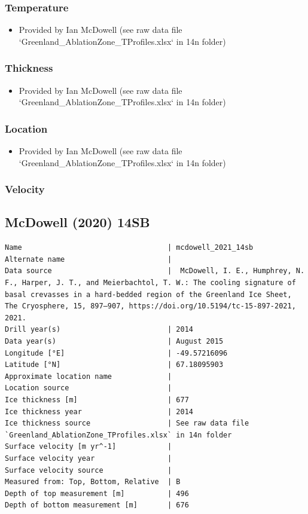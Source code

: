 \documentclass[article,a4paper,times,11pt,twoside]{article}
\begin{document}
\subsubsection{Temperature}
\label{sec:org6b4b784}

\begin{itemize}
\item Provided by Ian McDowell (see raw data file `Greenland\_AblationZone\_TProfiles.xlsx` in 14n folder)
\end{itemize}

\subsubsection{Thickness}
\label{sec:org78777b8}

\begin{itemize}
\item Provided by Ian McDowell (see raw data file `Greenland\_AblationZone\_TProfiles.xlsx` in 14n folder)
\end{itemize}

\subsubsection{Location}
\label{sec:org8b51f47}

\begin{itemize}
\item Provided by Ian McDowell (see raw data file `Greenland\_AblationZone\_TProfiles.xlsx` in 14n folder)
\end{itemize}

\subsubsection{Velocity}
\label{sec:org63b3212}
\clearpage
\subsection{McDowell (2020) 14SB}
\label{sec:org909041d}
\begin{verbatim}
Name                                  | mcdowell_2021_14sb
Alternate name                        | 
Data source                           |  McDowell, I. E., Humphrey, N. F., Harper, J. T., and Meierbachtol, T. W.: The cooling signature of basal crevasses in a hard-bedded region of the Greenland Ice Sheet, The Cryosphere, 15, 897–907, https://doi.org/10.5194/tc-15-897-2021, 2021.
Drill year(s)                         | 2014
Data year(s)                          | August 2015
Longitude [°E]                        | -49.57216096
Latitude [°N]                         | 67.18095903
Approximate location name             | 
Location source                       | 
Ice thickness [m]                     | 677
Ice thickness year                    | 2014
Ice thickness source                  | See raw data file `Greenland_AblationZone_TProfiles.xlsx` in 14n folder
Surface velocity [m yr^-1]            | 
Surface velocity year                 | 
Surface velocity source               | 
Measured from: Top, Bottom, Relative  | B
Depth of top measurement [m]          | 496
Depth of bottom measurement [m]       | 676
\end{verbatim}
\end{document}

